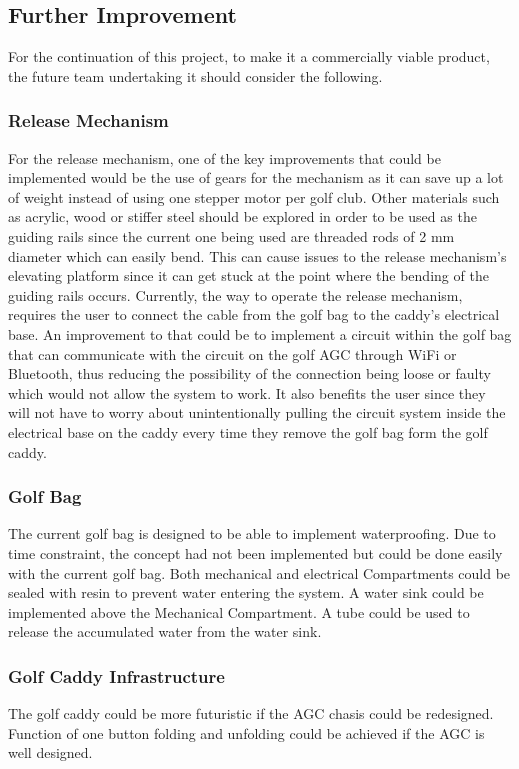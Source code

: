 \documentclass[11pt,landscape]{article}
\begin{document}
\begin{multicols}{2}
\subsection{Further Improvement}

For the continuation of this project, to make it a commercially viable
product, the future team undertaking it should consider the following.

\subsubsection{Release Mechanism}
For the release mechanism, one of the key improvements that could be
implemented would be the use of gears for the mechanism as it can save up a
lot of weight instead of using one stepper motor per golf club. Other
materials such as acrylic, wood or stiffer steel should be explored in order
to be used as the guiding rails since the current one being used are
threaded rods of 2 mm diameter which can easily bend. This can cause issues
to the release mechanism’s elevating platform since it can get stuck at the
point where the bending of the guiding rails occurs. Currently, the way to
operate the release mechanism, requires the user to connect the cable from
the golf bag to the caddy’s electrical base. An improvement to that could be
to implement a circuit within the golf bag that can communicate with the
circuit on the golf AGC through WiFi or Bluetooth, thus reducing the
possibility of the connection being loose or faulty which would not allow the system
to work. It also benefits the user since they will not have to worry about
unintentionally pulling the circuit system inside the electrical base on the
caddy every time they remove the golf bag form the golf caddy. 

\subsubsection{Golf Bag}
The current golf bag is designed to be able to implement waterproofing. Due
to time constraint, the concept had not been implemented but could be done
easily with the current golf bag. Both mechanical and electrical Compartments
could be sealed with resin to prevent water entering the system. A water
sink could be implemented above the Mechanical Compartment. A tube could be
used to release the accumulated water from the water sink.

\subsubsection{Golf Caddy Infrastructure}
The golf caddy could be more futuristic if the AGC chasis could be redesigned.
Function of one button folding and unfolding could be achieved if the AGC is
well designed.


\end{multicols}
\end{document}
